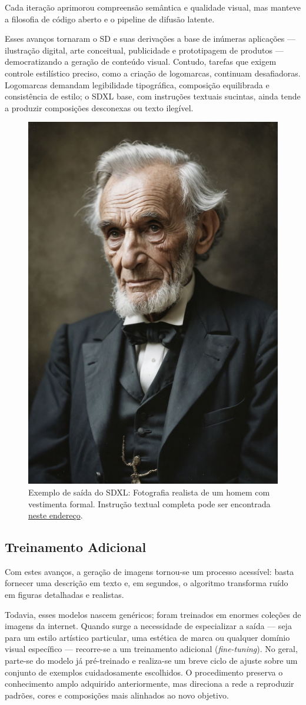 \documentclass[12pt, %
openright, 
oneside, %
a4paper,    %
brazil]{facom-ufu-abntex2}
\begin{document}
Cada iteração aprimorou compreensão semântica e qualidade visual, mas manteve a filosofia de código aberto e o pipeline de difusão latente.

Esses avanços tornaram o SD e suas derivações a base de inúmeras aplicações — ilustração digital, arte conceitual, publicidade e prototipagem de produtos — democratizando a geração de conteúdo visual. Contudo, tarefas que exigem controle estilístico preciso, como a criação de logomarcas, continuam desafiadoras. Logomarcas demandam legibilidade tipográfica, composição equilibrada e consistência de estilo; o SDXL base, com instruções textuais sucintas, ainda tende a produzir composições desconexas ou texto ilegível.

\begin{figure}[H]
    \centering
	\includegraphics[width=0.35\linewidth]{figuras/sdxl-sample-1.jpeg}
	\caption[Exemplo realista de saída do SDXL]{Exemplo de saída do SDXL: Fotografia realista de um homem com vestimenta formal. Instrução textual completa pode ser encontrada \href{https://civitai.com/images/45346112}{neste endereço}.}
	\label{fig:sdxlSample1}
\end{figure}

\subsection*{Treinamento Adicional}

Com estes avanços, a geração de imagens tornou-se um processo acessível: basta fornecer uma descrição em texto e, em segundos, o algoritmo transforma ruído em figuras detalhadas e realistas.

Todavia, esses modelos nascem genéricos; foram treinados em enormes coleções de imagens da internet. Quando surge a necessidade de especializar a saída — seja para um estilo artístico particular, uma estética de marca ou qualquer domínio visual específico — recorre-se a um treinamento adicional (\emph{fine-tuning}). No geral, parte-se do modelo já pré-treinado e realiza-se um breve ciclo de ajuste sobre um conjunto de exemplos cuidadosamente escolhidos. O procedimento preserva o conhecimento amplo adquirido anteriormente, mas direciona a rede a reproduzir padrões, cores e composições mais alinhados ao novo objetivo.
\end{document}
